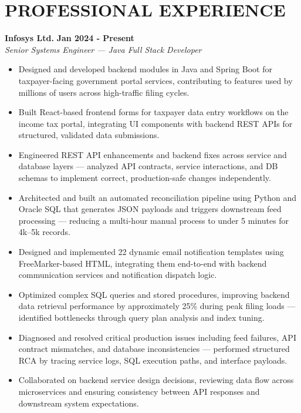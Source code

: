 \documentclass[a4paper,10pt]{article}
\begin{document}
\section*{PROFESSIONAL EXPERIENCE}
\textbf{Infosys Ltd.} \hfill \textbf{Jan 2024 - Present} \\
\textit{Senior Systems Engineer --- Java Full Stack Developer}
\begin{itemize}[leftmargin=*,noitemsep]
    \item Designed and developed backend modules in Java and Spring Boot for taxpayer-facing government portal services, contributing to features used by millions of users across high-traffic filing cycles.
    \item Built React-based frontend forms for taxpayer data entry workflows on the income tax portal, integrating UI components with backend REST APIs for structured, validated data submissions.
    \item Engineered REST API enhancements and backend fixes across service and database layers --- analyzed API contracts, service interactions, and DB schemas to implement correct, production-safe changes independently.
    \item Architected and built an automated reconciliation pipeline using Python and Oracle SQL that generates JSON payloads and triggers downstream feed processing --- reducing a multi-hour manual process to under 5 minutes for 4k--5k records.
    \item Designed and implemented 22 dynamic email notification templates using FreeMarker-based HTML, integrating them end-to-end with backend communication services and notification dispatch logic.
    \item Optimized complex SQL queries and stored procedures, improving backend data retrieval performance by approximately 25\% during peak filing loads --- identified bottlenecks through query plan analysis and index tuning.
    \item Diagnosed and resolved critical production issues including feed failures, API contract mismatches, and database inconsistencies --- performed structured RCA by tracing service logs, SQL execution paths, and interface payloads.
    \item Collaborated on backend service design decisions, reviewing data flow across microservices and ensuring consistency between API responses and downstream system expectations.
\end{itemize}
\end{document}
